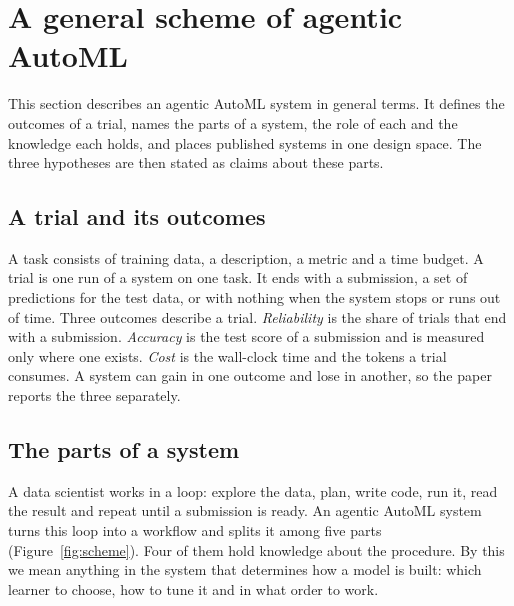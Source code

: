 \section{A general scheme of agentic AutoML}
\label{sec:scheme}


This section describes an agentic AutoML system in general terms. It
defines the outcomes of a trial, names the parts of a system, the role of
each and the knowledge each holds, and places published systems in one design space. The three
hypotheses are then stated as claims about these parts.

\subsection{A trial and its outcomes}
\label{sec:outcomes}

A task consists of training data, a description, a metric and a time
budget. A trial is one run of a system on one task. It ends with a
submission, a set of predictions for the test data, or with nothing when the
system stops or runs out of time. Three outcomes describe a trial.
\emph{Reliability} is the share of trials that end with a submission.
\emph{Accuracy} is the test score of a submission and is measured only
where one exists. \emph{Cost} is the wall-clock time and the tokens a
trial consumes. A system can gain in one outcome and lose in another, so
the paper reports the three separately.

\subsection{The parts of a system}
\label{sec:parts}

A data scientist works in a loop: explore the data, plan, write code, run
it, read the result and repeat until a submission is ready. An agentic
AutoML system turns this loop into a workflow and splits it among five parts
(Figure~\ref{fig:scheme}). Four of them hold knowledge about the procedure.
By this we mean anything in the system that determines how a model is
built: which learner to choose, how to tune it and in what order to work.

